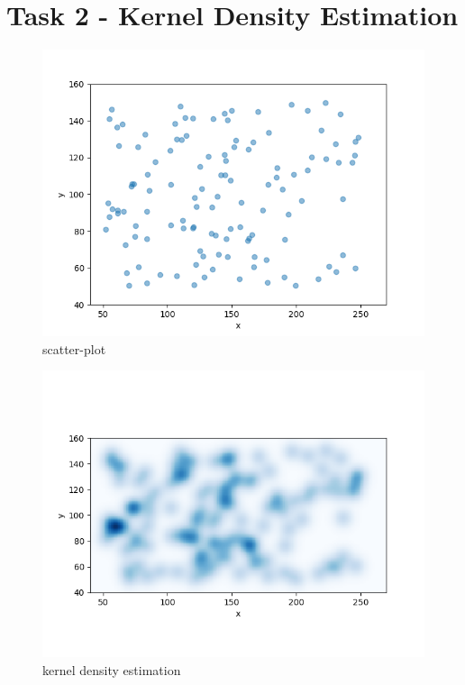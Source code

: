 \documentclass[a4paper]{article}
\begin{document}
\section*{Task 2 - Kernel Density Estimation}
\begin{figure}[th!]
	\centering
	\includegraphics[width=0.7\linewidth]{scatter}
	\caption{scatter-plot}
	\label{fig:scatter}
\end{figure}

\begin{figure}[th!]
	\centering
	\includegraphics[width=0.7\linewidth]{density}
	\caption{kernel density estimation}
	\label{fig:density}
\end{figure}
\end{document}
